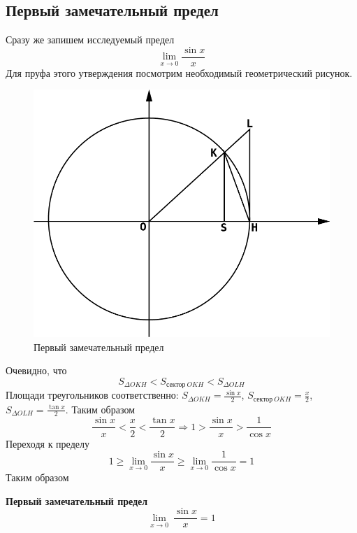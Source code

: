 \subsection{Первый замечательный предел}
Сразу же запишем исследуемый предел
\begin{equation*}
    \lim_{x \rightarrow 0} \frac{\sin x}{x}
\end{equation*}
Для пруфа этого утверждения посмотрим необходимый геометрический рисунок. 
\begin{figure}[h!]
    \centering
    \includegraphics[scale=0.5]{pics/first_great_lim.png}
    \caption{Первый замечательный предел}
\end{figure}

Очевидно, что
\begin{equation*}
    S_{\Delta OKH} < S_{\text{сектор}\ OKH} < S_{\Delta OLH}
\end{equation*}
Площади треугольников соответственно: $S_{\Delta OKH} = \frac{\sin x}{2}$, $S_{\text{сектор}\ OKH} = \frac{x}{2}$, $S_{\Delta OLH} = \frac{\tan x}{2}$. Таким образом
\begin{equation*}
    \frac{\sin x}{x} < \frac{x}{2} < \frac{\tan x}{2} \Rightarrow 1 > \frac{\sin x}{x} > \frac{1}{\cos x}
\end{equation*}
Переходя к пределу
\begin{equation*}
    1 \geq \lim_{x \rightarrow 0} \frac{\sin x}{x} \geq \lim_{x \rightarrow 0} \frac{1}{\cos x} = 1
\end{equation*}
Таким образом
\begin{theorem}
    \textbf{Первый замечательный предел}
    \begin{equation*}
        \lim_{x \rightarrow 0}\ \frac{\sin x}{x} = 1
    \end{equation*}
\end{theorem}